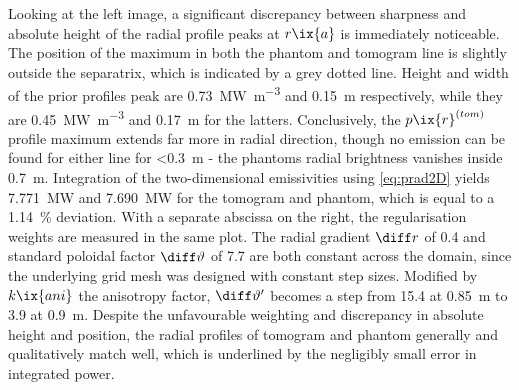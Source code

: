            Looking at the left image, a significant discrepancy between sharpness and absolute height of the radial profile peaks at $r\ix{a}$ is immediately noticeable. The position of the maximum in both the phantom and tomogram line is slightly outside the separatrix, which is indicated by a grey dotted line. Height and width of the prior profiles peak are \SI{0.73}{\mega\watt\per\cubic\meter} and \SI{0.15}{\meter} respectively, while they are \SI{0.45}{\mega\watt\per\cubic\meter} and \SI{0.17}{\meter} for the latters. Conclusively, the $p\ix{r}^{\left(tom\right)}$ profile maximum extends far more in radial direction, though no emission can be found for either line for <\SI{0.3}{\meter} - the phantoms radial brightness vanishes inside \SI{0.7}{\meter}. Integration of the two-dimensional emissivities using \cref{eq:prad2D} yields \SI{7.771}{\mega\watt} and \SI{7.690}{\mega\watt} for the tomogram and phantom, which is equal to a \SI{1.14}{\percent} deviation. With a separate abscissa on the right, the regularisation weights are measured in the same plot. The radial gradient $\diff r$ of \SI{0.4}{\arbitraryunit} and standard poloidal factor $\diff \vartheta$ of \SI{7.7}{\arbitraryunit} are both constant across the domain, since the underlying grid mesh was designed with constant step sizes. Modified by $k\ix{ani}$ the anisotropy factor, $\diff \vartheta^{\prime}$ becomes a step from \SI{15.4}{\arbitraryunit} at \SI{0.85}{\meter} to \SI{3.9}{\arbitraryunit} at \SI{0.9}{\meter}. Despite the unfavourable weighting and discrepancy in absolute height and position, the radial profiles of tomogram and phantom generally and qualitatively match well, which is underlined by the negligibly small error in integrated power.\\%
